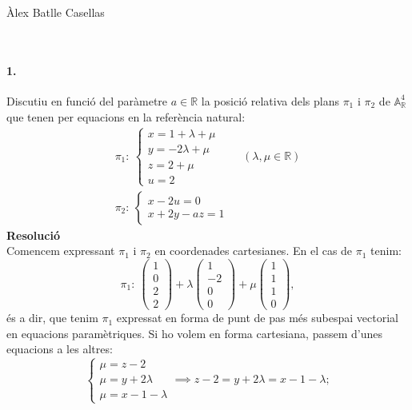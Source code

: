 \documentclass[11pt]{article}
\author{Àlex Batlle Casellas}
\newcommand{\af}{\mathbb{A}}
\begin{document}
\begin{small}
Àlex Batlle Casellas
\end{small}\\
\paragraph{1.}	Discutiu en funció del paràmetre $a\in\mathbb{R}$ la posició relativa dels plans $\pi_1$ i $\pi_2$ de $\af^4_{\mathbb{R}}$ que tenen per equacions en la referència natural:
\begin{align*}
	\pi_1:\ \begin{cases} x=1+\lambda+\mu \\ y=-2\lambda+\mu \\ z=2+\mu \\ u=2 \end{cases}\qquad (\lambda,\mu\in\mathbb{R}) \\
	\pi_2:\ \begin{cases} x-2u=0 \\ x+2y-az=1 \end{cases}
\end{align*}
\textbf{Resolució}\\
Comencem expressant $\pi_1$ i $\pi_2$ en coordenades cartesianes. En el cas de $\pi_1$ tenim:
\begin{equation}
\pi_1:\ \begin{pmatrix}
1\\ 0\\ 2\\ 2
\end{pmatrix}+\lambda\begin{pmatrix}
1\\ -2\\ 0\\ 0
\end{pmatrix}+\mu\begin{pmatrix}
1\\ 1\\ 1\\ 0
\end{pmatrix},
\end{equation}
és a dir, que tenim $\pi_1$ expressat en forma de punt de pas més subespai vectorial en equacions paramètriques. Si ho volem en forma cartesiana, passem d'unes equacions a les altres:
\begin{equation}
\begin{cases}\mu=z-2\\ \mu=y+2\lambda\\ \mu=x-1-\lambda\end{cases}\implies z-2=y+2\lambda=x-1-\lambda;
\end{equation}
\end{document}
